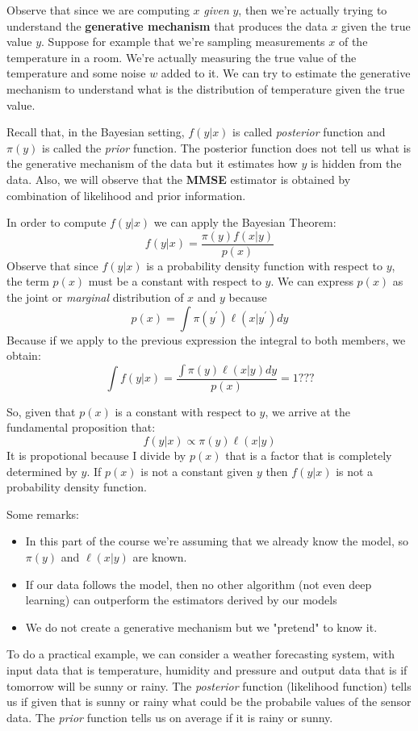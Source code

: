 Observe that since we are computing $x$ \textit{given} $y$, then we're actually trying to understand the \textbf{generative mechanism} that produces the data $x$ given the true value $y$. Suppose for example that we're sampling measurements $x$ of the temperature in a room. We're actually measuring the true value of the temperature and some noise $w$ added to it. We can try to estimate the generative mechanism to understand what is the distribution of temperature given the true value.

Recall that, in the Bayesian setting, $f(y|x)$ is called \textit{posterior} function and $\pi(y)$ is called the \textit{prior} function. The posterior function does not tell us what is the generative mechanism of the data but it estimates how $y$ is hidden from the data. Also, we will observe that the \textbf{MMSE} estimator is obtained by combination of likelihood and prior information.

In order to compute $f(y|x)$ we can apply the Bayesian Theorem:
\[
    f(y|x) = \frac{\pi(y) f(x|y)}{p(x)}
\]
Observe that since $f(y|x)$ is a probability density function with respect to $y$, the term $p(x)$ must be a constant with respect to $y$. We can express $p(x)$ as the joint or \textit{marginal} distribution of $x$ and $y$ because
\[
    p(x) = \int \pi(y^{\prime}) \ell(x|y^{\prime} ) dy
\]
Because if we apply to the previous expression the integral to both members, we obtain:
\[
    \int f(y|x) = \frac{\int \pi(y) \ell(x|y) dy}{p(x)} = 1 ???
\]

So, given that $p(x)$ is a constant with respect to $y$, we arrive at the fundamental proposition that:
\[
    f(y|x) \propto \pi(y) \ell(x|y)
\]
It is propotional because I divide by $p(x)$ that is a factor that is completely determined by $y$. If $p(x)$ is not a constant given $y$ then $f(y|x)$ is not a probability density function.

Some remarks:
\begin{itemize}
    \item In this part of the course we're assuming that we already know the model, so $\pi(y)$ and $\ell(x|y)$ are known.
    \item If our data follows the model, then no other algorithm (not even deep learning) can outperform the estimators derived by our models
    \item We do not create a generative mechanism but we "pretend" to know it.
\end{itemize}

To do a practical example, we can consider a weather forecasting system, with input data that is temperature, humidity and pressure and output data that is if tomorrow will be sunny or rainy. The \textit{posterior} function (likelihood function) tells us if given that is sunny or rainy what could be the probabile values of the sensor data. The \textit{prior} function tells us on average if it is rainy or sunny.

